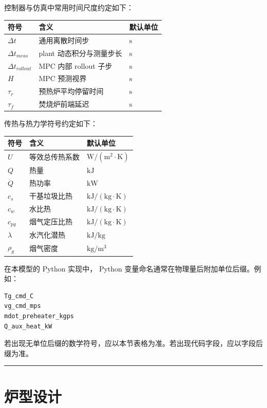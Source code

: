 \documentclass[UTF8,openany,zihao=-4,oneside]{ctexbook}
\newcommand{\manualdivider}{\par\vspace{0.6em}\noindent\textcolor{FGLine}{\rule{\linewidth}{0.7pt}}\vspace{0.6em}\par}
\begin{document}
控制器与仿真中常用时间尺度约定如下：

\begin{longtable}[c]{@{}lll@{}}
\toprule\noalign{}
符号 & 含义 & 默认单位 \\
\midrule\noalign{}
\endhead
\bottomrule\noalign{}
\endlastfoot
\(\Delta t\) & 通用离散时间步 & \(\mathrm{s}\) \\
\(\Delta t_{meas}\) & plant 动态积分与测量步长 & \(\mathrm{s}\) \\
\(\Delta t_{rollout}\) & MPC 内部 rollout 子步 & \(\mathrm{s}\) \\
\(H\) & MPC 预测视界 & \(\mathrm{s}\) \\
\(\tau_r\) & 预热炉平均停留时间 & \(\mathrm{s}\) \\
\(\tau_f\) & 焚烧炉前端延迟 & \(\mathrm{s}\) \\
\end{longtable}

传热与热力学符号约定如下：

\begin{longtable}[c]{@{}lll@{}}
\toprule\noalign{}
符号 & 含义 & 默认单位 \\
\midrule\noalign{}
\endhead
\bottomrule\noalign{}
\endlastfoot
\(U\) & 等效总传热系数 & \(\mathrm{W/(m^2\cdot K)}\) \\
\(Q\) & 热量 & \(\mathrm{kJ}\) \\
\(\dot Q\) & 热功率 & \(\mathrm{kW}\) \\
\(c_s\) & 干基垃圾比热 & \(\mathrm{kJ/(kg\cdot K)}\) \\
\(c_w\) & 水比热 & \(\mathrm{kJ/(kg\cdot K)}\) \\
\(c_{pg}\) & 烟气定压比热 & \(\mathrm{kJ/(kg\cdot K)}\) \\
\(\lambda\) & 水汽化潜热 & \(\mathrm{kJ/kg}\) \\
\(\rho_g\) & 烟气密度 & \(\mathrm{kg/m^3}\) \\
\end{longtable}

在本模型的 Python 实现中， Python 变量命名通常在物理量后附加单位后缀。例如：

\begin{lstlisting}
Tg_cmd_C
vg_cmd_mps
mdot_preheater_kgps
Q_aux_heat_kW
\end{lstlisting}

若出现无单位后缀的数学符号，应以本节表格为准。若出现代码字段，应以字段后缀为准。

\manualdivider

\chapter{炉型设计}\label{ux7089ux578bux8bbeux8ba1}
\end{document}
